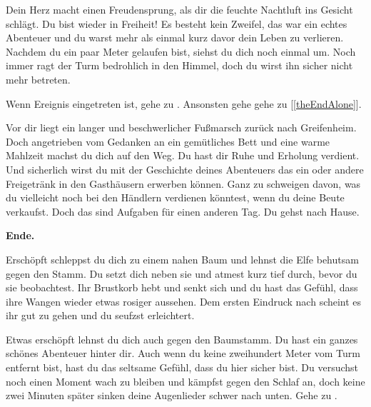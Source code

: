 

Dein Herz macht einen Freudensprung, als dir die feuchte Nachtluft ins Gesicht schlägt. Du bist wieder in Freiheit! Es besteht kein Zweifel, das war ein echtes Abenteuer und du warst mehr als einmal kurz davor dein Leben zu verlieren. Nachdem du ein paar Meter gelaufen bist, siehst du dich noch einmal um. Noch immer ragt der Turm bedrohlich in den Himmel, doch du wirst ihn sicher nicht mehr betreten.

Wenn Ereignis  eingetreten ist, gehe zu . Ansonsten gehe gehe zu [\ref{theEndAlone}].


Vor dir liegt ein langer und beschwerlicher Fußmarsch zurück nach Greifenheim. Doch angetrieben vom Gedanken an ein gemütliches Bett und eine warme Mahlzeit machst du dich auf den Weg. Du hast dir Ruhe und Erholung verdient. Und sicherlich wirst du mit der Geschichte deines Abenteuers das ein oder andere Freigetränk in den Gasthäusern erwerben können. Ganz zu schweigen davon, was du vielleicht noch bei den Händlern verdienen könntest, wenn du deine Beute verkaufst. Doch das sind Aufgaben für einen anderen Tag. Du gehst nach Hause.

\textbf{Ende.}


Erschöpft schleppst du dich zu einem nahen Baum und lehnst die Elfe behutsam gegen den Stamm. Du setzt dich neben sie und atmest kurz tief durch, bevor du sie beobachtest. Ihr Brustkorb hebt und senkt sich und du hast das Gefühl, dass ihre Wangen wieder etwas rosiger aussehen. Dem ersten Eindruck nach scheint es ihr gut zu gehen und du seufzst erleichtert.

Etwas erschöpft lehnst du dich auch gegen den Baumstamm. Du hast ein ganzes schönes Abenteuer hinter dir. Auch wenn du keine zweihundert Meter vom Turm entfernt bist, hast du das seltsame Gefühl, dass du hier sicher bist. Du versuchst noch einen Moment wach zu bleiben und kämpfst gegen den Schlaf an, doch keine zwei Minuten später sinken deine Augenlieder schwer nach unten.
Gehe zu .
